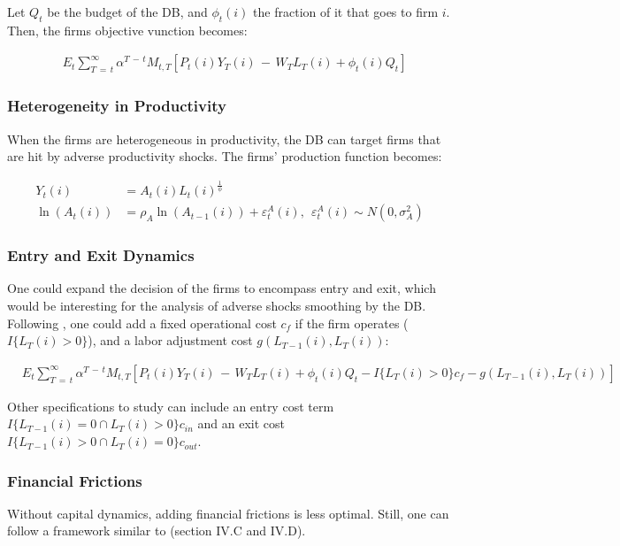\documentclass[12pt]{article}
\begin{document}
Let $Q_t$ be the budget of the DB, and $\phi_t(i)$ the fraction of it that goes to firm $i$. Then, the firms objective vunction becomes:

\begin{align*}
    &E_{t}\sum_{T\,=\,t}^{\infty}\alpha^{T\,-\,t}M_{t,T}[P_{t}(i)Y_{T}(i)\,-\,W_{T}L_{T}(i) + \phi_t(i)Q_t]
\end{align*}


\subsubsection{Heterogeneity in Productivity}

When the firms are heterogeneous in productivity, the DB can target firms that are hit by adverse productivity shocks. The firms' production function becomes:

\begin{align*}
    Y_t(i) &= A_t(i)L_t(i)^{\frac{1}{\phi}}\\
    \ln(A_t(i)) &= \rho_A\ln(A_{t-1}(i)) + \varepsilon_t^A(i), ~~ \varepsilon_t^A(i) \sim N(0, \sigma^2_A)
\end{align*}


\subsubsection{Entry and Exit Dynamics}

One could expand the decision of the firms to encompass entry and exit, which would be interesting for the analysis of adverse shocks smoothing by the DB. Following \cite{hopenhayn_1993}, one could add a fixed operational cost $c_f$ if the firm operates ($I\{L_T(i) > 0\}$), and a labor adjustment cost $g(L_{T-1}(i), L_T(i))$:

\begin{align*}
    &E_{t}\sum_{T\,=\,t}^{\infty}\alpha^{T\,-\,t}M_{t,T}[P_{t}(i)Y_{T}(i)\,-\,W_{T}L_{T}(i) + \phi_t(i)Q_t - I\{L_T(i) > 0\}c_f - g(L_{T-1}(i), L_T(i))]
\end{align*}

Other specifications to study can include an entry cost term $I\{L_{T-1}(i) = 0 \cap L_T(i) > 0\}c_{in}$ and an exit cost $I\{L_{T-1}(i) > 0 \cap L_T(i) = 0\}c_{out}$.


\subsubsection{Financial Frictions}

Without capital dynamics, adding financial frictions is less optimal. Still, one can follow a framework similar to \cite{alfaro_2024} (section IV.C and IV.D).
\end{document}
